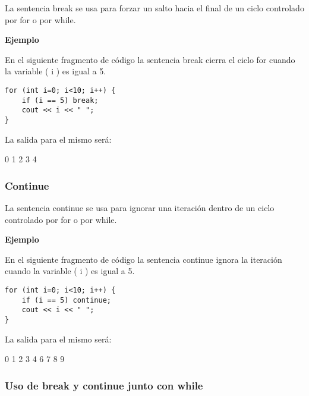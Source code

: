 La sentencia break se usa para forzar un salto hacia el final de un ciclo controlado por for o por while.

\begin{center}
	\textbf{Ejemplo}
\end{center}

En el siguiente fragmento de código la sentencia break cierra el ciclo for cuando la variable ( i ) es igual a 5. 

\begin{lstlisting}[style=Cpp, label=break, caption=Break]
for (int i=0; i<10; i++) {
    if (i == 5) break;
    cout << i << " ";
}
\end{lstlisting}

La salida para el mismo será:

\begin{listing}[style=consola, numbers=none,label=resultado-break,caption=Resultado Break]
0 1 2 3 4
\end{listing}


\subsubsection{Continue}

La sentencia continue se usa para ignorar una iteración dentro de un ciclo controlado por for o por while.

\begin{center}
	\textbf{Ejemplo}
\end{center}

En el siguiente fragmento de código la sentencia continue ignora la iteración cuando la variable ( i ) es igual a 5.

\begin{lstlisting}[style=Cpp, label=continue, caption=Continue]
for (int i=0; i<10; i++) {
    if (i == 5) continue;
    cout << i << " ";
}
\end{lstlisting}

La salida para el mismo será:

\begin{listing}[style=consola, numbers=none,label=resultado-continue,caption=Resultado Continue]
0 1 2 3 4 6 7 8 9
\end{listing}

\subsubsection{Uso de break y continue junto con while}

